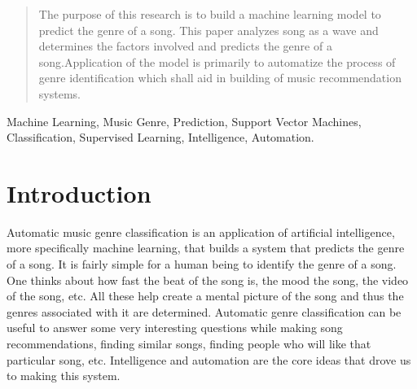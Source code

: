 \documentclass[conference]{IEEEtran}
\begin{document}




\maketitle


\begin{abstract}
The purpose of this research is to build a machine learning model to  predict the genre of a song. This paper  analyzes song as a wave and determines the factors involved and predicts the genre of a song.Application of the model  is primarily to automatize the process of genre identification which shall aid in building of music recommendation systems.

\end{abstract}

    \begin{IEEEkeywords}
    Machine Learning, Music Genre, Prediction, Support Vector Machines, Classification, Supervised Learning, Intelligence, Automation.
    \end{IEEEkeywords}






    \IEEEpeerreviewmaketitle



    \section{Introduction}
    Automatic music genre classification is an application of artificial intelligence, more specifically machine learning, that builds a system that predicts the genre of a song. It is fairly simple for a human being to identify the genre of a song. One thinks about how fast the beat of the song is, the mood the song, the video of the song, etc. All these help create a mental picture of the song and thus the genres associated with it are determined. Automatic genre classification can be useful to answer some very interesting questions while making song recommendations, finding similar songs, finding people who will like that particular song, etc. Intelligence and automation are the core ideas that drove us to making this system.
\end{document}

